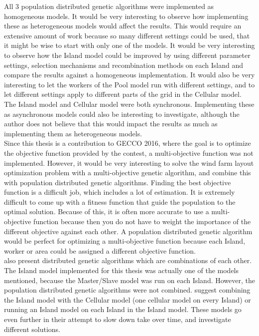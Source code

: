 \noindent All 3 population distributed genetic algorithms were implemented as homogeneous models. It would be very interesting to observe how implementing these as heterogeneous models would affect the results. This would require an extensive amount of work because so many different settings could be used, that it might be wise to start with only one of the models. It would be very interesting to observe how the Island model could be improved by using different parameter settings, selection mechanisms and recombination methods on each Island and compare the results against a homogeneous implementation. It would also be very interesting to let the workers of the Pool model run with different settings, and to let different settings apply to different parts of the grid in the Cellular model.\\


\noindent The Island model and Cellular model were both synchronous. Implementing these as asynchronous models could also be interesting to investigate, although the author does not believe that this would impact the results as much as implementing them as heterogeneous models.\\


\noindent Since this thesis is a contribution to GECCO 2016, where the goal is to optimize the objective function provided by the contest, a multi-objective function was not implemented. However, it would be very interesting to solve the wind farm layout optimization problem with a multi-objective genetic algorithm, and combine this with population distributed genetic algorithms. Finding the best objective function is a difficult job, which includes a lot of estimation. It is extremely difficult to come up with a fitness function that guide the population to the optimal solution. Because of this, it is often more accurate to use a multi-objective function because then you do not have to weight the importance of the different objective against each other. A population distributed genetic algorithm would be perfect for optimizing a multi-objective function because each Island, worker or area could be assigned a different objective function.\\


\noindent \cite{Gong} also present distributed genetic algorithms which are combinations of each other. The Island model implemented for this thesis was actually one of the models mentioned, because the Master/Slave model was run on each Island. However, the population distributed genetic algorithms were not combined. \citep{Gong} suggest combining the Island model with the Cellular model (one cellular model on every Island) or running an Island model on each Island in the Island model. These models go even further in their attempt to slow down take over time, and investigate different solutions.\\


